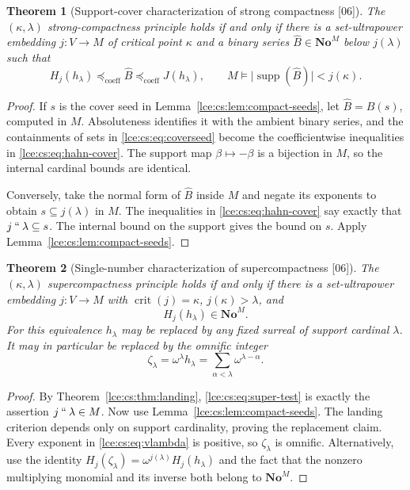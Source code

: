 \documentclass[11pt,letterpaper]{article}
\numberwithin{equation}{section}
\newtheorem{theorem}{Theorem}[section]
\theoremstyle{definition}
\theoremstyle{remark}
\newcommand{\No}{\mathbf{No}}
\newcommand{\supp}{\operatorname{supp}}
\newcommand{\crit}{\operatorname{crit}}
\newcommand{\imset}[2]{#1\mathbin{``}#2}
\newcommand{\abs}[1]{\lvert#1\rvert}
\newcommand{\thref}[1]{Theorem~\ref{#1}}
\newcommand{\leref}[1]{Lemma~\ref{#1}}
\newcommand{\src}[1]{\textup{\textsf{\small[#1]}}}%
\newcommand{\lecoeff}{\preccurlyeq_{\mathrm{coeff}}}
\begin{document}
\begin{theorem}[Support-cover characterization of strong compactness \src{06}]
\label{lce:cs:thm:strong-cover}
The $(\kappa,\lambda)$ strong-compactness principle holds if and only if there
is a set-ultrapower embedding $j:V\to M$ of critical point $\kappa$ and a
binary series $\widehat B\in\No^M$ below $j(\lambda)$ such that
\begin{equation}\label{lce:cs:eq:hahn-cover}
 H_j(h_\lambda)\lecoeff\widehat B\lecoeff J(h_\lambda),
 \qquad M\models\abs{\supp(\widehat B)}<j(\kappa).
\end{equation}
\end{theorem}
\begin{proof}
If $s$ is the cover seed in \leref{lce:cs:lem:compact-seeds}, let
$\widehat B=B(s)$, computed in $M$. Absoluteness identifies it with the
ambient binary series, and the containments of sets in
\eqref{lce:cs:eq:coverseed} become the coefficientwise inequalities in
\eqref{lce:cs:eq:hahn-cover}. The support map $\beta\mapsto-\beta$ is a
bijection in $M$, so the internal cardinal bounds are identical.

Conversely, take the normal form of $\widehat B$ inside $M$ and negate its
exponents to obtain $s\subseteq j(\lambda)$ in $M$. The inequalities in
\eqref{lce:cs:eq:hahn-cover} say exactly that $\imset j\lambda\subseteq s$.
The internal bound on the support gives the bound on $s$. Apply
\leref{lce:cs:lem:compact-seeds}.
\end{proof}

\begin{theorem}[Single-number characterization of supercompactness \src{06}]
\label{lce:cs:thm:super-descent}
The $(\kappa,\lambda)$ supercompactness principle holds if and only if there
is a set-ultrapower embedding $j:V\to M$ with $\crit(j)=\kappa$,
$j(\kappa)>\lambda$, and
\begin{equation}\label{lce:cs:eq:super-test}
 H_j(h_\lambda)\in\No^M.
\end{equation}
For this equivalence $h_\lambda$ may be replaced by \emph{any} fixed surreal
of support cardinal $\lambda$. It may in particular be replaced by the
omnific integer
\begin{equation}\label{lce:cs:eq:vlambda}
 \zeta_\lambda=\omega^\lambda h_\lambda=\sum_{\alpha<\lambda}\omega^{\lambda-\alpha}.
\end{equation}
\end{theorem}
\begin{proof}
By \thref{lce:cs:thm:landing}, \eqref{lce:cs:eq:super-test} is exactly the
assertion $\imset j\lambda\in M$. Now use \leref{lce:cs:lem:compact-seeds}.
The landing criterion depends only on support cardinality, proving the
replacement claim. Every exponent in \eqref{lce:cs:eq:vlambda} is positive,
so $\zeta_\lambda$ is omnific. Alternatively, use the identity
$H_j(\zeta_\lambda)=\omega^{j(\lambda)}H_j(h_\lambda)$ and the fact that the
nonzero multiplying monomial and its inverse both belong to $\No^M$.
\end{proof}
\end{document}
